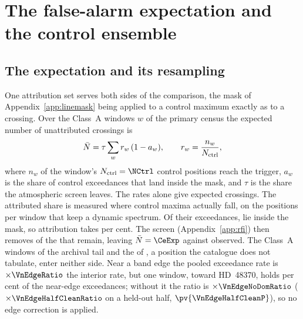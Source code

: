 \section{The false-alarm expectation and the control ensemble}
\label{app:falsealarm}

\subsection{The expectation and its resampling}

One attribution set serves both sides of the comparison, the mask of
Appendix~\ref{app:linemask} being applied to a control maximum exactly as to a
crossing. Over the \CeNWin{} Class~A windows $w$ of the primary census the
expected number of unattributed crossings is
\begin{equation*}
\bar N=\tau\sum_{w}r_w\,(1-a_w),\qquad r_w=\frac{n_w}{N_{\rm ctrl}},
\end{equation*}
where $n_w$ of the window's $N_{\rm ctrl}=\NCtrl$ control positions reach the
trigger, $a_w$ is the share of control exceedances that land inside the
mask, and $\tau$ is the share the atmospheric screen leaves. The rates alone
give \CeExpTrig{} expected crossings. The attributed share is measured where control maxima
actually fall, on the \RcNRetCtrl{} positions per window that keep a dynamic
spectrum. Of their \CeNExc{} exceedances, \CeNExcAttr{} lie inside the
mask, so attribution takes \CeMaskPct{} per cent. The screen
(Appendix~\ref{app:rfi}) then removes \CeTlCtrlCut{} of the \CeTlCtrlSurv{}
that remain, leaving $\bar N=\CeExp$ against \CeObs{} observed. The
\CeNWinTail{} Class~A windows of the archival tail and the \CeNWinComp{} of
\OmXStar, a position the catalogue does not tabulate, enter neither side.
Near a band edge the pooled exceedance rate is $\times\VnEdgeRatio$ the
interior rate, but one window, toward HD~48370, holds \VnEdgeDomPct{} per
cent of the near-edge exceedances; without it the ratio is
$\times\VnEdgeNoDomRatio$ ($\times\VnEdgeHalfCleanRatio$ on a held-out half,
$\pv{\VnEdgeHalfCleanP}$), so no edge correction is applied.

